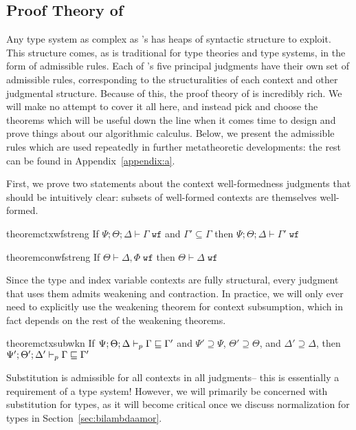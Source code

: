 \subsection{Proof Theory of \dlambdaamor}
Any type system as complex as \dlambdaamor's has heaps of syntactic structure to exploit. This structure comes, as is traditional for type theories and type systems, in the form of admissible rules. Each of \dlambdaamor's five principal judgments have their own set of admissible rules, corresponding to the structuralities of each context and other judgmental structure. Because of this, the proof theory of \dlambdaamor is incredibly rich. We will make no attempt to cover it all here, and instead pick and choose the theorems which will be useful down the line when it comes time to design and prove things about our algorithmic calculus. Below, we present the admissible rules which are used repeatedly in further metatheoretic developments: the rest can be found in Appendix~\ref{appendix:a}.

First, we prove two statements about the context well-formedness judgments that should be intuitively clear: subsets of well-formed contexts are themselves well-formed.

\begin{restatable}[]{theorem}{ctxwfstreng}
If $\Psi ; \Theta ; \Delta \vdash \Gamma \; \texttt{wf}$ and $\Gamma' \subseteq \Gamma$ then $\Psi ; \Theta ; \Delta \vdash \Gamma' \; \texttt{wf}$
\end{restatable}

\begin{restatable}[]{theorem}{conwfstreng}
If $\Theta \vdash \Delta, \Phi \; \texttt{wf}$ then $\Theta \vdash \Delta \; \texttt{wf}$
\end{restatable}

Since the type and index variable contexts are fully structural, every judgment that uses them admits weakening and contraction. In practice, we will only ever need to explicitly use the weakening theorem for context subsumption, which in fact depends on the rest of the weakening theorems.

\begin{restatable}[]{theorem}{ctxsubwkn}
If $\Psi ; \Theta ; \Delta \vdash_p \Gamma \sqsubseteq \Gamma'$ and $\Psi' \supseteq \Psi$, $\Theta' \supseteq \Theta$, and $\Delta' \supseteq \Delta$, then
$\Psi' ; \Theta' ; \Delta' \vdash_p \Gamma \sqsubseteq \Gamma'$
\label{thm:ctx-sub-wkn}
\end{restatable}

Substitution is admissible for all contexts in all judgments-- this is essentially a requirement of a type system! However, we will primarily be concerned with substitution for types, as it will become critical once we discuss normalization for types in Section~\ref{sec:bilambdaamor}.

